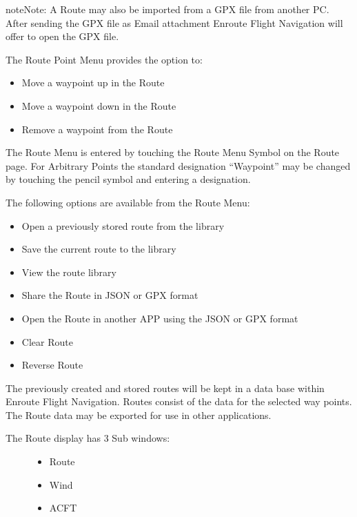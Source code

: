 \documentclass[letterpaper,10pt,english]{sphinxmanual}
\begin{document}
\begin{sphinxadmonition}{note}{Note:}
A Route may also be imported from a GPX file from another PC. After sending the GPX file as Email attachment Enroute Flight Navigation will offer to open the GPX file.
\end{sphinxadmonition}

The Route Point Menu provides the option to:
\begin{itemize}
\item {} 
Move a waypoint up in the Route

\item {} 
Move a waypoint down in the Route

\item {} 
Remove a waypoint from the Route

\end{itemize}

The Route Menu is entered by touching the Route Menu Symbol on the Route page.
For Arbitrary Points the standard designation “Waypoint” may be changed by touching the pencil symbol and entering a designation.

The following options are available from the Route Menu:
\begin{itemize}
\item {} 
Open a previously stored route from the library

\item {} 
Save the current route to the library

\item {} 
View the route library

\item {} 
Share the Route in JSON or GPX format

\item {} 
Open the Route in another APP using the JSON or GPX format

\item {} 
Clear Route

\item {} 
Reverse Route

\end{itemize}

The previously created and stored routes will be kept in a data base within Enroute Flight Navigation. Routes consist of the data for the selected way points. The Route data may be exported for use in other applications.
\begin{description}
\item[{The Route display has 3 Sub windows:}] \leavevmode\begin{itemize}
\item {} 
Route

\item {} 
Wind

\item {} 
ACFT

\end{itemize}

\end{description}
\end{document}
